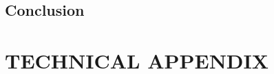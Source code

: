 \documentclass[letterpaper,12pt]{article}
\theoremstyle{definition}
\begin{document}
\begin{spacing}{1.5}

  \clearpage


\section{Conclusion}\label{SecConclusion}


\end{spacing}




\newpage
\renewcommand{\theequation}{T.\arabic{section}.\arabic{equation}}
\renewcommand{\thesection}{T-\arabic{section}}   %

\setcounter{equation}{0}                         %
\setcounter{section}{0}                          %
\section*{TECHNICAL APPENDIX}

\setcounter{equation}{0}                         %
\end{document}

